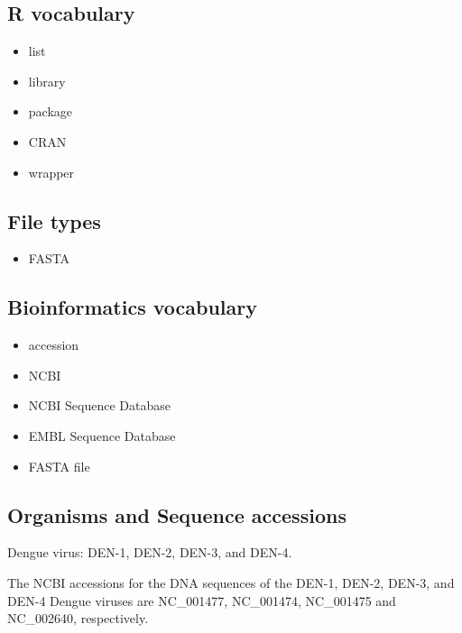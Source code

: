 \documentclass[
]{book}
\providecommand{\tightlist}{%
  \setlength{\itemsep}{0pt}\setlength{\parskip}{0pt}}
\begin{document}
\hypertarget{r-vocabulary}{%
\subsection{R vocabulary}\label{r-vocabulary}}

\begin{itemize}
\tightlist
\item
  list
\item
  library
\item
  package
\item
  CRAN
\item
  wrapper
\end{itemize}

\hypertarget{file-types}{%
\subsection{File types}\label{file-types}}

\begin{itemize}
\tightlist
\item
  FASTA
\end{itemize}

\hypertarget{bioinformatics-vocabulary}{%
\subsection{Bioinformatics vocabulary}\label{bioinformatics-vocabulary}}

\begin{itemize}
\tightlist
\item
  accession
\item
  NCBI
\item
  NCBI Sequence Database
\item
  EMBL Sequence Database
\item
  FASTA file
\end{itemize}

\hypertarget{organisms-and-sequence-accessions}{%
\subsection{Organisms and Sequence accessions}\label{organisms-and-sequence-accessions}}

Dengue virus: DEN-1, DEN-2, DEN-3, and DEN-4.

The NCBI accessions for the DNA sequences of the DEN-1, DEN-2, DEN-3, and DEN-4 Dengue viruses are NC\_001477, NC\_001474, NC\_001475 and NC\_002640, respectively.
\end{document}
